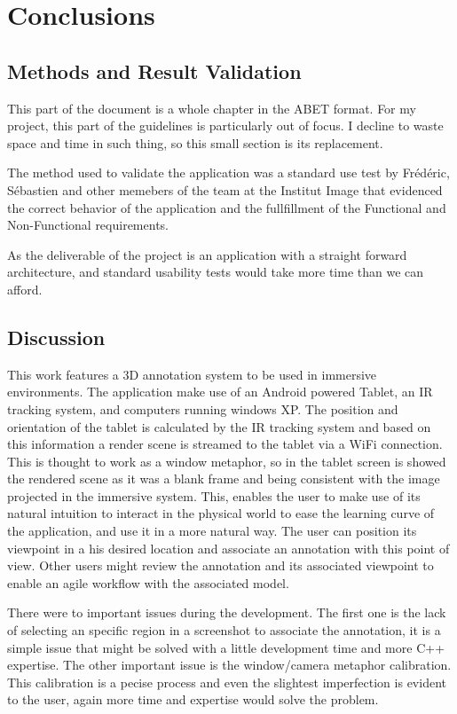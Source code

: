 \chapter{Conclusions}
\section{Methods and Result Validation}

This part of the document is a whole chapter in the ABET format. For my project, this part of the guidelines is particularly out of focus. I decline to waste space and time in such thing, so this small section is its replacement.

The method used to validate the application was a standard use test by Frédéric, Sébastien and other memebers of the team at the Institut Image that evidenced the correct behavior of the application and the fullfillment of the Functional and Non-Functional requirements.

As the deliverable of the project is an application with a straight forward architecture, and standard usability tests would take more time than we can afford.
\section{Discussion}
This work features a 3D annotation system to be used in immersive environments. The application make use of an Android powered Tablet, an IR tracking system, and computers running windows XP. The position and orientation of the tablet is calculated by the IR tracking system and based on this information a render scene is streamed to the tablet via a WiFi connection. This is thought to work as a window metaphor, so in the tablet screen is showed the rendered scene as it was a blank frame and being consistent with the image projected in the immersive system.  This, enables the user to make use of its natural intuition to interact in the physical world to ease the learning curve of the application, and use it in a more natural way. The user can position its viewpoint in a his desired location and associate an annotation with this point of view. Other users might review the annotation and its associated viewpoint to enable an agile workflow with the associated model.

There were to important issues during the development. The first one is the lack of selecting an specific region in a screenshot to associate the annotation, it is a simple issue that might be solved with a little development time and more C++ expertise. The other important issue is the window/camera metaphor calibration. This calibration is a pecise process and even the slightest imperfection is evident to the user, again more time and expertise would solve the problem.

